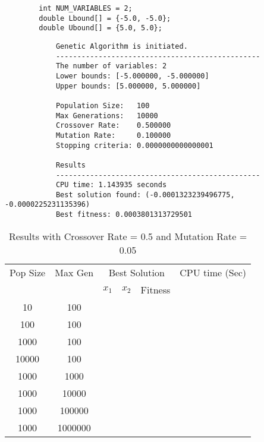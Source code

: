 \documentclass[12pt]{article}
\begin{document}
	\begin{lstlisting}
		int NUM_VARIABLES = 2;
		double Lbound[] = {-5.0, -5.0};
		double Ubound[] = {5.0, 5.0};
	\end{lstlisting}
	
	
	\begin{mdframed}[style=myboxstyleTerminal1]
		\begin{verbatim}
			Genetic Algorithm is initiated.
			------------------------------------------------
			The number of variables: 2
			Lower bounds: [-5.000000, -5.000000]
			Upper bounds: [5.000000, 5.000000]
			
			Population Size:   100
			Max Generations:   10000
			Crossover Rate:    0.500000
			Mutation Rate:     0.100000
			Stopping criteria: 0.0000000000000001
			
			Results
			------------------------------------------------
			CPU time: 1.143935 seconds
			Best solution found: (-0.0001323239496775, -0.0000225231135396)
			Best fitness: 0.0003801313729501
		\end{verbatim}
	\end{mdframed}
	
	 
	\begin{table}[h!]
		\caption{Results with Crossover Rate = 0.5 and Mutation Rate = 0.05}
		\label{table:1}
		\centering
		\begin{tabular}{c c c c c c}
			\hline
			Pop Size & Max Gen & \multicolumn{3}{c}{Best Solution} & CPU time (Sec) \\
			& & $x_1$ & $x_2$ & Fitness & \\
			\hline
			10  & 100    &  &  & &\\
			100 & 100    &  &  & &\\
			1000& 100    &  &   & &\\
			10000& 100    &  &   & &\\
			\hline
			1000  & 1000   &  & & &\\
			1000 & 10000  &  &  & &\\
			1000& 100000 &  &   & &\\
			1000& 1000000 &  &   & &\\
			\hline
		\end{tabular}
	\end{table}
\end{document}
